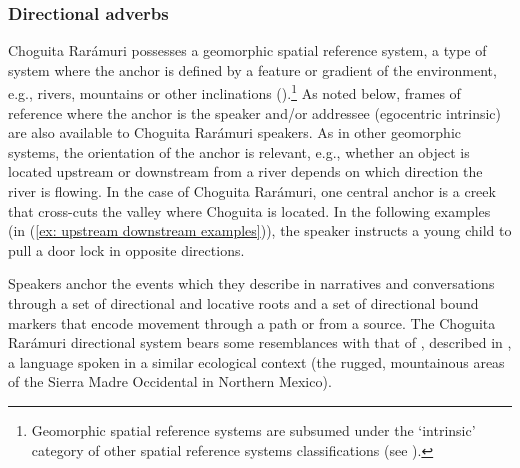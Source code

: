 \subsubsection{Directional adverbs}
\label{subsubsec: directional adverbs}


Choguita Rarámuri possesses a geomorphic spatial reference system, a type of system where the anchor is defined by a feature or gradient of the environment, e.g., rivers, mountains or other inclinations (\citealt[842]{o2011spatial}).\footnote{Geomorphic spatial reference systems are subsumed under the `intrinsic' category of other spatial reference systems classifications (see \citealt{levinson1996language}).} As noted below, frames of reference where the anchor is the speaker and/or addressee (egocentric intrinsic) are also available to Choguita Rarámuri speakers. As in other geomorphic systems, the orientation of the anchor is relevant, e.g., whether an object is located upstream or downstream from a river depends on which direction the river is flowing. In the case of Choguita Rarámuri, one central anchor is a creek that cross-cuts the valley where Choguita is located. In the following examples (in (\ref{ex: upstream downstream examples})), the speaker instructs a young child to pull a door lock in opposite directions.

\ea\label{ex: upstream downstream examples}

    \z
\z

Speakers anchor the events which they describe in narratives and conversations through a set of directional and locative roots and a set of directional bound markers that encode movement through a path or from a source. The Choguita Rarámuri directional system bears some resemblances with that of , described in \citet{miller1996guarijio}, a language spoken in a similar ecological context (the rugged, mountainous areas of the Sierra Madre Occidental in Northern Mexico).

